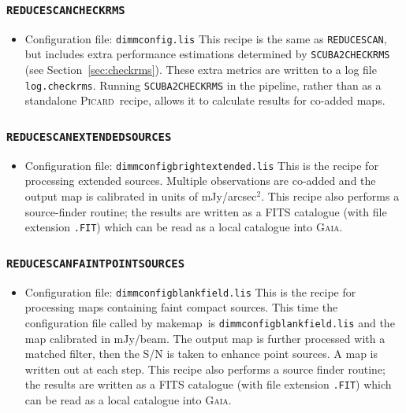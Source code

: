 \documentclass[twoside,11pt]{article}
\newcommand{\htmlref}[2]{#1}
\newcommand{\latexhtml}[2]{#1}
\newcommand{\xref}[3]{#1}
\newcommand{\xlabel}[1]{}
\renewcommand{\_}{\texttt{\symbol{95}}}
\newcommand{\gaia}{\xref{\textsc{Gaia}}{sun214}{}}
\newcommand{\picard}{\xref{\textsc{Picard}}{sun265}{}}
\newcommand{\drrecipe}[1]{\texttt{#1}}
\newcommand{\task}[1]{\textsf{#1}}
\newcommand{\file}[1]{\texttt{#1}}
\newcommand{\makemap}{\xref{\task{makemap}}{sun258}{MAKEMAP}}
\newcommand{\cref}[3]{\latexhtml{#1~\ref{#2}}{\htmlref{#3}{#2}}}
\begin{document}
\subsubsection{\xlabel{extsources}\drrecipe{REDUCE\_SCAN\_CHECKRMS}}
\begin{itemize}
\item  Configuration file: \file{dimmconfig.lis}
\newline\newline
This recipe is the same as \drrecipe{REDUCE\_SCAN}, but includes extra
performance estimations determined by \drrecipe{SCUBA2\_CHECK\_RMS} (see
\cref{Section}{sec:checkrms}{Getting the noise}). These extra metrics
are written to a log file \file{log.checkrms}. Running \drrecipe{SCUBA2\_CHECK\_RMS}
in the pipeline, rather than as a standalone \picard\ recipe, allows it
to calculate results for co-added maps.
\end{itemize}

\subsubsection{\xlabel{extsources}\drrecipe{REDUCE\_SCAN\_EXTENDED\_SOURCES}}
\begin{itemize}
\item  Configuration file: \file{dimmconfig\_bright\_extended.lis}
\newline\newline
This is the recipe for processing extended sources. Multiple observations
are co-added and the output
map is calibrated in units of mJy/arcsec$^2$. This recipe also
performs a source-finder routine; the results are written as a FITS
catalogue (with file extension \file{.FIT}) which can be read as a
local catalogue into \gaia.
\end{itemize}

\subsubsection{\xlabel{faint}\drrecipe{REDUCE\_SCAN\_FAINT\_POINT\_SOURCES}}
\begin{itemize}
\item  Configuration file: \file{dimmconfig\_blank\_field.lis}
\newline\newline
This is the recipe for processing maps containing faint compact
sources. This time the configuration file called by \makemap\
is \file{dimmconfig\_blank\_field.lis} and the map calibrated in mJy/beam.
The output map is further processed with a matched filter, then the
S/N is taken to enhance point sources.  A map is written out at each step.
This recipe also performs a source finder routine; the results are written
as a FITS catalogue (with file extension \file{.FIT}) which can be
read as a local catalogue into \gaia.
\end{itemize}
\end{document}
